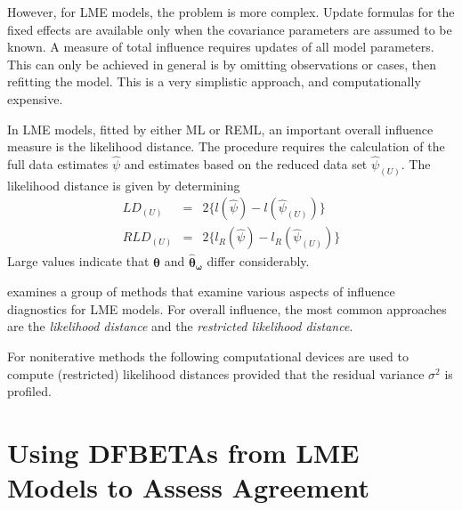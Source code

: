 \documentclass[12pt, a4paper]{report}
\theoremstyle{plain}
\theoremstyle{definition}
\theoremstyle{remark}
\begin{document}
	
	However, for LME models, the problem is more complex. Update formulas for the fixed effects are available only when the covariance parameters are assumed to be known. A measure of total influence requires updates of all model parameters. This can only be achieved in general is by omitting observations or cases, then refitting the model. This is a very simplistic approach, and computationally expensive.
	

In LME models, fitted by either ML or REML, an important overall
influence measure is the likelihood distance. The
procedure requires the calculation of the full data estimates
$\hat{\psi}$ and estimates based on the reduced data set
$\hat{\psi}_{(U)}$. The likelihood distance is given by
determining
\begin{eqnarray}
LD_{(U)} &=& 2\{l(\hat{\psi}) - l( \hat{\psi}_{(U)}) \}\\
RLD_{(U)} &=& 2\{l_{R}(\hat{\psi}) - l_{R}(\hat{\psi}_{(U)})\}
\end{eqnarray}
Large values indicate that $\boldsymbol{\hat{\theta}}$ and $\boldsymbol{\hat{\theta}_\omega}$ differ considerably.
	
\citet{west} examines a group of methods that examine various aspects of influence diagnostics for LME models. For overall influence, the most common approaches are the \textit{likelihood distance} and the \textit{restricted likelihood distance}.

For noniterative methods the following computational devices are used to compute (restricted) likelihood distances provided that the residual variance
	$\sigma^2$ is profiled.

\section{Using DFBETAs from LME Models to Assess Agreement}
	


\end{document}
